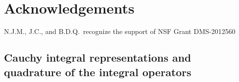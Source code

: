 \documentclass[3p]{elsarticle}
\begin{document}
\section*{Acknowledgements}
N.J.M., J.C., and B.D.Q.~recognize the support of NSF Grant DMS-2012560





\begin{appendices}
\renewcommand{\theequation}{A.\arabic{equation}}
\setcounter{equation}{0}

\section{Cauchy integral representations and quadrature of the integral operators}
\label{appendix:A}


\end{appendices}
\end{document}
